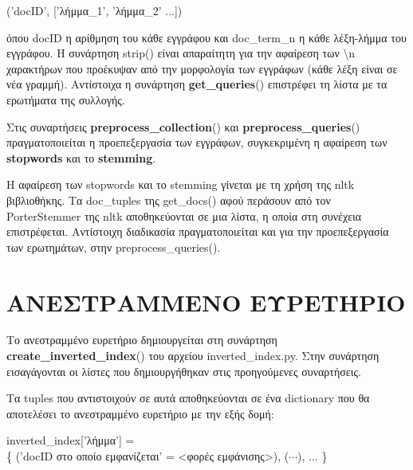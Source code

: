 \documentclass[12pt]{report}
\begin{document}
                \begin{graycomment} \centering
                {\fontCode\footnotesize ('docID', ['λήμμα\_1', 'λήμμα\_2' ...])}
                \end{graycomment}

            \noindent όπου {\fontCode\small docID} η αρίθμηση του κάθε εγγράφου και {\fontCode\small doc\_term\_n} η κάθε λέξη-λήμμα του εγγράφου.
            Η συνάρτηση {\fontCode\small strip()} είναι απαραίτητη για την αφαίρεση των {\fontCode\small \textbackslash n} χαρακτήρων
            που προέκυψαν από την μορφολογία των εγγράφων (κάθε λέξη είναι σε νέα γραμμή).
            Αντίστοιχα η συνάρτηση {\fontCode\small \textbf{get\_queries}()} επιστρέφει τη λίστα με τα ερωτήματα της συλλογής.

            Στις συναρτήσεις {\fontCode\small \textbf{preprocess\_collection}()} και {\fontCode\small \textbf{preprocess\_queries}()}
            πραγματοποιείται η προεπεξεργασία των εγγράφων, συγκεκριμένη η αφαίρεση των \textbf{stopwords} και το \textbf{stemming}.


            Η αφαίρεση των stopwords και το stemming γίνεται με τη χρήση της {\fontCode\small nltk} βιβλιοθήκης. Τα {\fontCode\small doc\_tuples} της
            {\fontCode\small get\_docs()} αφού περάσουν από τον {\fontCode\small PorterStemmer} της {\fontCode\small nltk} αποθηκεύονται σε μια λίστα,
            η οποία στη συνέχεια επιστρέφεται.
            Αντίστοιχη διαδικασία πραγματοποιείται και για την προεπεξεργασία των ερωτημάτων, στην {\fontCode\small preprocess\_queries()}.

        \section{ΑΝΕΣΤΡΑΜΜΕΝΟ ΕΥΡΕΤΗΡΙΟ}

            Το ανεστραμμένο ευρετήριο δημιουργείται στη συνάρτηση {\fontCode\small \textbf{create\_inverted\_index}()} του αρχείου {\fontCode\small inverted\_index.py}.
            Στην συνάρτηση εισαγάγονται οι λίστες που δημιουργήθηκαν στις προηγούμενες συναρτήσεις.

            Τα tuples που αντιστοιχούν σε αυτά αποθηκεύονται σε ένα dictionary που θα αποτελέσει το ανεστραμμένο ευρετήριο με την εξής δομή:

                \begin{graycomment} \centering
                    {\fontCode\footnotesize inverted\_index['λήμμα'] = \\ \{ ('docID στο οποίο εμφανίζεται' = <φορές εμφάνισης>), (\(\cdots\)), \(\ldots\) \}}
                \end{graycomment}
\end{document}
